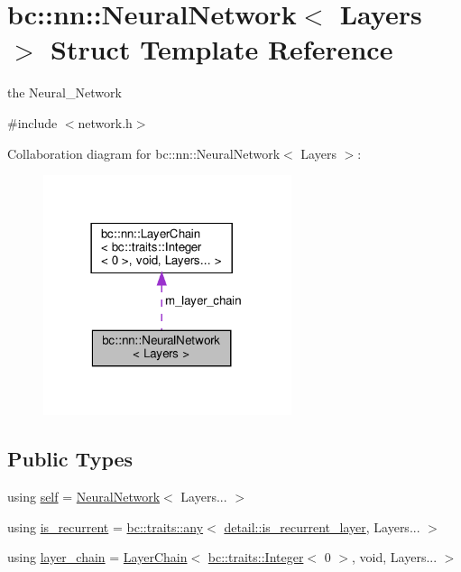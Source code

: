 \hypertarget{structbc_1_1nn_1_1NeuralNetwork}{}\section{bc\+:\+:nn\+:\+:Neural\+Network$<$ Layers $>$ Struct Template Reference}
\label{structbc_1_1nn_1_1NeuralNetwork}


the Neural\+\_\+\+Network  




{\ttfamily \#include $<$network.\+h$>$}



Collaboration diagram for bc\+:\+:nn\+:\+:Neural\+Network$<$ Layers $>$\+:\nopagebreak
\begin{figure}[H]
\begin{center}
\leavevmode
\includegraphics[width=206pt]{structbc_1_1nn_1_1NeuralNetwork__coll__graph}
\end{center}
\end{figure}
\subsection*{Public Types}
\begin{DoxyCompactItemize}
\item 
using \hyperlink{structbc_1_1nn_1_1NeuralNetwork_a4d111884489da78dc5143d0a9ea7361b}{self} = \hyperlink{structbc_1_1nn_1_1NeuralNetwork}{Neural\+Network}$<$ Layers... $>$
\item 
using \hyperlink{structbc_1_1nn_1_1NeuralNetwork_a5661d3309e97f88e1fe580a9cc41d867}{is\+\_\+recurrent} = \hyperlink{structbc_1_1traits_1_1any}{bc\+::traits\+::any}$<$ \hyperlink{namespacebc_1_1nn_1_1detail_a05af00abf685410896e4af7ebfdc3929}{detail\+::is\+\_\+recurrent\+\_\+layer}, Layers... $>$
\item 
using \hyperlink{structbc_1_1nn_1_1NeuralNetwork_aa313d17911ed2cfaa9355c2f7a9f6846}{layer\+\_\+chain} = \hyperlink{structbc_1_1nn_1_1LayerChain}{Layer\+Chain}$<$ \hyperlink{structbc_1_1traits_1_1Integer}{bc\+::traits\+::\+Integer}$<$ 0 $>$, void, Layers... $>$
\end{DoxyCompactItemize}
